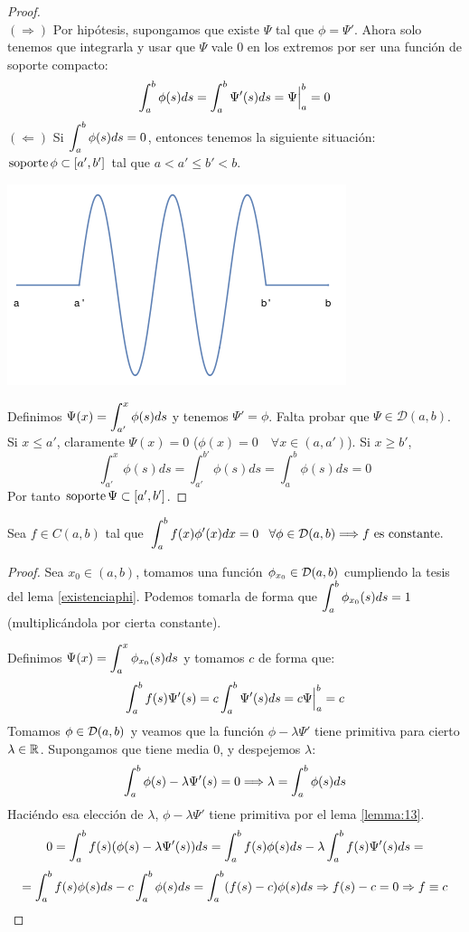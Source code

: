 \begin{proof}
\hfill\\
$(\Rightarrow)$ Por hipótesis, supongamos que existe $\Psi$ tal que $\phi=\Psi'$. Ahora solo tenemos que integrarla y usar que $\Psi$ vale 0 en los extremos por ser una función de soporte compacto:
\[
\displaystyle\int_{ a }^{ b } \phi(s)ds=\displaystyle\int_{ a }^{ b } \Psi'(s)ds=\Psi\Big|_a^b=0
\]
$(\Leftarrow)$  Si $\displaystyle\int_{ a }^{ b } \phi(s)ds=0$, entonces tenemos la siguiente situación: $\operatorname{soporte}\phi\subset[a',b']$ tal que $a<a'\leq b'<b$.

\begin{center}
\includegraphics[scale=0.4]{./img/testfuncion.png}
\end{center}

Definimos $\Psi(x)=\displaystyle\int_{ a' }^{ x } \phi(s)ds$ y tenemos $\Psi'=\phi$. Falta probar que $\Psi\in\mathcal{D}(a,b)$.
Si $x\leq a'$, claramente $\Psi(x)=0$ \big($\phi(x)=0\quad\forall x\in(a,a')$\big). Si $x\geq b'$,
\[
\int_{a'}^x\phi(s)ds=\int_{a'}^{b'}\phi(s)ds=\int_{a}^{b}\phi(s)ds=0
\]
Por tanto $\operatorname{soporte}\Psi\subset[a',b']$.

\end{proof}

\begin{lemma}
\label{lemma:14}
Sea $f\in C(a,b)$ tal que $\displaystyle\int_{ a }^{ b } f(x)\phi'(x)dx=0\;\;\;\forall\phi\in\mathcal{D}(a,b)\Longrightarrow f \text{ es constante.}$
\end{lemma}

\begin{proof}
Sea $x_0\in(a,b)$, tomamos una función $\phi_{x_0}\in \mathcal{D}(a,b)$ cumpliendo la tesis del lema \ref{existenciaphi}. Podemos tomarla de forma que $\displaystyle\int_{ a }^{ b } \phi_{x_0}(s)ds=1$ (multiplicándola por cierta constante). 

Definimos $\Psi(x)=\displaystyle\int_{ a }^{ x } \phi_{x_0}(s)ds$ y tomamos $c$ de forma que:
\[
\displaystyle\int_{ a }^{ b } f(s)\Psi'(s)=c\displaystyle\int_{ a }^{ b } \Psi'(s)ds=c\Psi\Big|_a^b=c
\]
Tomamos $\phi\in\mathcal{D}(a,b)$ y veamos que la función $\phi-\lambda\Psi'$ tiene primitiva para cierto $\lambda\in\mathbb{R}$. Supongamos que tiene media 0, y despejemos $\lambda$:
\[
\displaystyle\int_{ a }^{ b } \phi(s)-\lambda\Psi'(s)=0 \Longrightarrow \lambda=\displaystyle\int_{ a }^{ b } \phi(s)ds
\]
Haciéndo esa elección de $\lambda$, $\phi-\lambda\Psi'$ tiene primitiva por el lema \ref{lemma:13}.
\[
0=\displaystyle\int_{ a }^{ b } f(s)(\phi(s)-\lambda\Psi'(s))ds=\displaystyle\int_{ a }^{ b } f(s)\phi(s)ds-\lambda\displaystyle\int_{ a }^{ b } f(s)\Psi'(s)ds=
\]
\[
=\displaystyle\int_{ a }^{ b } f(s)\phi(s)ds-c\displaystyle\int_{ a }^{ b } \phi(s)ds=\displaystyle\int_{ a }^{ b } (f(s)-c)\phi(s)ds \Rightarrow f(s)-c=0 \Rightarrow f\equiv c
\]
\end{proof}

